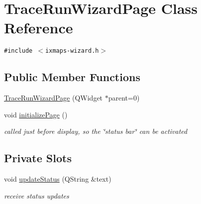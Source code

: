 \hypertarget{classTraceRunWizardPage}{
\section{TraceRunWizardPage Class Reference}
\label{classTraceRunWizardPage}
}
{\tt \#include $<$ixmaps-wizard.h$>$}

\subsection*{Public Member Functions}
\begin{CompactItemize}
\item 
\hyperlink{classTraceRunWizardPage_f800e04662636ac441ef3446e4251fb9}{TraceRunWizardPage} (QWidget $\ast$parent=0)
\item 
\hypertarget{classTraceRunWizardPage_03116dfb119eb6bc951971b9e114d6e4}{
void \hyperlink{classTraceRunWizardPage_03116dfb119eb6bc951971b9e114d6e4}{initializePage} ()}
\label{classTraceRunWizardPage_03116dfb119eb6bc951971b9e114d6e4}

\begin{CompactList}\small\item\em called just before display, so the \char`\"{}status bar\char`\"{} can be activated \item\end{CompactList}\end{CompactItemize}
\subsection*{Private Slots}
\begin{CompactItemize}
\item 
\hypertarget{classTraceRunWizardPage_407090d429a4a8328ed4aa1373617995}{
void \hyperlink{classTraceRunWizardPage_407090d429a4a8328ed4aa1373617995}{updateStatus} (QString \&text)}
\label{classTraceRunWizardPage_407090d429a4a8328ed4aa1373617995}

\begin{CompactList}\small\item\em receive status updates \item\end{CompactList}\end{CompactItemize}
